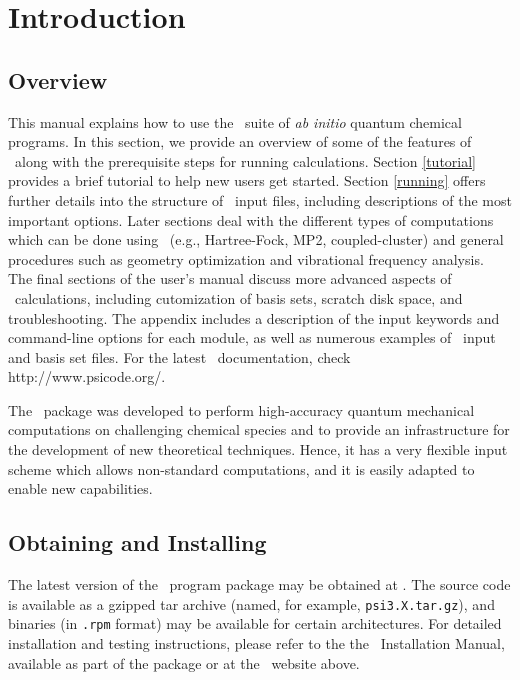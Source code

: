 \section{Introduction} \label{introduction}

\subsection{Overview}
This manual explains how to use the
\PSIthree\ suite of {\em ab initio} quantum chemical programs.  
In this section, we provide an overview of some
of the features of \PSIthree\ along with the prerequisite steps for
running calculations.  Section \ref{tutorial} provides a brief
tutorial to help new users get started.  Section \ref{running} offers
further details into the structure of \PSIthree\ input files,
including descriptions of the most important options.
Later sections deal with the different types of computations which
can be done using \PSIthree\ (e.g., Hartree-Fock, MP2, coupled-cluster)
and general procedures such as geometry optimization
and vibrational frequency analysis.  The final sections of the user's manual 
discuss more advanced aspects of \PSIthree\
calculations, including cutomization of basis sets, scratch disk
space, and troubleshooting.  The appendix includes a description of
the input keywords and command-line options for each module, as well
as numerous examples of \PSIthree\ input and basis set files.
For the latest \PSIthree\ documentation, check 
{http://www.psicode.org/}.

The \PSIthree\ package was developed to perform high-accuracy 
quantum mechanical computations on challenging chemical species
and to provide an infrastructure for the development of new
theoretical techniques.  Hence, it has a very flexible input
scheme which allows non-standard computations, and it is easily
adapted to enable new capabilities.

\subsection{Obtaining and Installing \PSIthree}
\label{installation}

The latest version of the \PSIthree\ program package may be obtained
at \htmladdnormallink{{\tt www.psicode.org}}{http://www.psicode.org}.
The source code is available as a gzipped tar archive (named, for
example, {\tt psi3.X.tar.gz}), and binaries (in {\tt .rpm} format) may
be available for certain architectures.  For detailed installation and
testing instructions, please refer to the the \PSIthree\
Installation Manual, available as part of the package or at the
\PSIthree\ website above.

